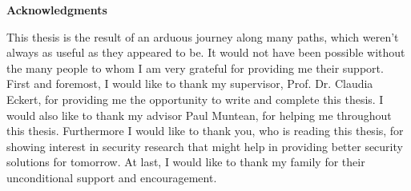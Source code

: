 \clearemptydoublepage
{}
{}	



\vspace*{2cm}

\begin{center}
{\Large \bf Acknowledgments}
\end{center}
\vspace{1cm}
This thesis is the result of an arduous journey along many paths, which weren't always as useful as they appeared to be. It would not have been possible without the many people to whom I am very grateful for providing me their support. First and foremost, I would like to thank my supervisor, Prof. Dr. Claudia Eckert, for providing me the opportunity to write and complete this thesis. I would also like to thank my advisor Paul Muntean, for helping me throughout this thesis.  Furthermore I would like to thank you, who is reading this thesis, for showing interest in security research that might help in providing better security solutions for tomorrow. At last, I would like to thank my family for their unconditional support and encouragement.
